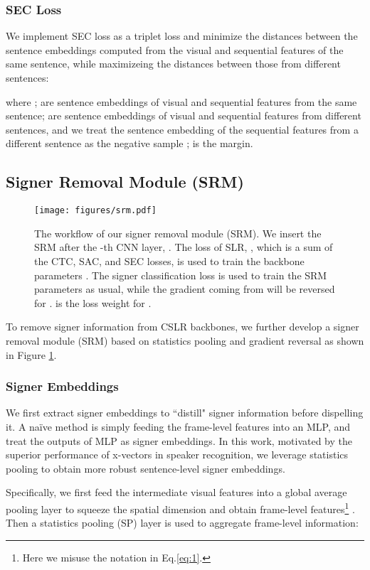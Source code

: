 \documentclass[acmsmall,screen]{acmart}
\begin{document}
\subsubsection{SEC Loss}
We implement SEC loss as a triplet loss \cite{schroff2015facenet} and minimize the distances between the sentence embeddings computed from the visual and sequential features of the same sentence, while maximizeing the distances between those from different sentences:

where ; 
 are sentence embeddings of visual and sequential features from the same sentence;
 are sentence embeddings of visual and sequential features from different sentences, and we treat the sentence embedding of the sequential features from a different sentence as the negative sample ;  is the margin.


\subsection{Signer Removal Module (SRM)}
\begin{figure}[t]
  \centering
  \texttt{[image: figures/srm.pdf]}
  \caption{The workflow of our signer removal module (SRM). We insert the SRM after the -th CNN layer, . The loss of SLR, , which is a sum of the CTC, SAC, and SEC losses, is used to train the backbone parameters . The signer classification loss  is used to train the SRM parameters  as usual, while the gradient coming from  will be reversed for .  is the loss weight for .}
  \label{fig:srm}
\end{figure}
To remove signer information from CSLR backbones, we further develop a signer removal module (SRM) based on statistics pooling and gradient reversal as shown in Figure \ref{fig:srm}. 

\subsubsection{Signer Embeddings}
We first extract signer embeddings to ``distill" signer information before dispelling it.
A na\"ive method is simply feeding the frame-level features into an MLP, and treat the outputs of MLP as signer embeddings.
In this work, motivated by the superior performance of x-vectors \cite{snyder2018x} in speaker recognition, we leverage statistics pooling to obtain more robust sentence-level signer embeddings.

Specifically, we first feed the intermediate visual features  into a global average pooling layer to squeeze the spatial dimension and obtain frame-level features\footnote{Here we misuse the notation  in Eq.\ref{eq:1}.} . 
Then a statistics pooling (SP) layer is used to aggregate frame-level information:
\end{document}
